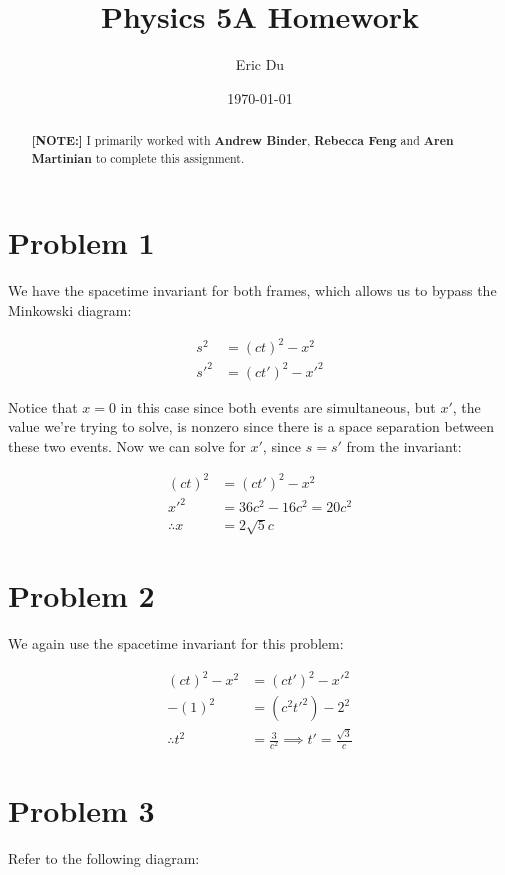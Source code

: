 \documentclass{article}
\title{Physics 5A Homework}
\author{Eric Du}
\date{\today}
\theoremstyle{definition}
\numberwithin{equation}{section}
\numberwithin{definition}{section}
\begin{document}
	\maketitle
	
	\begin{abstract}
		\noindent \textbf{[NOTE:]} I primarily worked with \textbf{Andrew Binder}, \textbf{Rebecca Feng} and \textbf{Aren Martinian} to complete this assignment.
	\end{abstract}
	\section{Problem 1}
	We have the spacetime invariant for both frames, which allows us to bypass the Minkowski diagram:
	
	\begin{align*}
		s^2 &= (ct)^2-x^2\\
		s'^2 &= (ct')^2 - x'^2
	\end{align*}

	Notice that $x = 0$ in this case since both events are simultaneous, but $x'$, the value we're trying to solve, is nonzero since there is a space separation between these two events. Now we can solve for $x'$, since $s = s'$ from the invariant:
	
	\begin{align*}
		(ct)^2 &= (ct')^2 - x^2\\
		x'^2 &= 36c^2 - 16c^2 = 20c^2\\
		\therefore x &= 2\sqrt{5}c
	\end{align*}

	\section{Problem 2}
	
	We again use the spacetime invariant for this problem: 
	
	\begin{align*}
		(ct)^2 -x^2 &= (ct')^2 - x'^2\\
		-(1)^2 &= (c^2t'^2) -2^2\\
		\therefore t^2 &= \frac{3}{c^2} \implies t' = \frac{\sqrt{3}}{c}
	\end{align*}


	\section{Problem 3}
	Refer to the following diagram:
	
\end{document}
